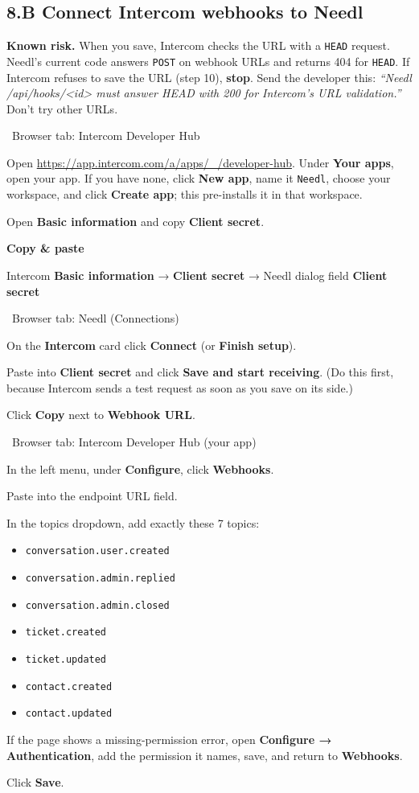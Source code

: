 \documentclass[11pt,a4paper]{article}
\newcommand{\ui}[1]{\textbf{#1}}
\newcommand{\where}[1]{\par\smallskip\noindent\colorbox{winbg}{\color{winfg}\bfseries\strut\ #1\ }\par\nopagebreak[4]}
\newcommand{\lit}[1]{\texttt{#1}}
\newenvironment{xfer}{\def\FrameCommand{\fboxsep=6pt\colorbox{xferbg}}\MakeFramed{\advance\hsize-\width\FrameRestore}\textbf{Copy \& paste}\par}{\endMakeFramed}
\newenvironment{warn}{\def\FrameCommand{\fboxsep=6pt\colorbox{warnbg}}\MakeFramed{\advance\hsize-\width\FrameRestore}}{\endMakeFramed}
\begin{document}
\subsection*{8.B Connect Intercom webhooks to Needl}
\begin{warn}
\textbf{Known risk.} When you save, Intercom checks the URL with a \lit{HEAD} request. Needl's current code answers \lit{POST} on webhook URLs and returns 404 for \lit{HEAD}. If Intercom refuses to save the URL (step 10), \textbf{stop}. Send the developer this: \emph{“Needl /api/hooks/<id> must answer HEAD with 200 for Intercom's URL validation.”} Don't try other URLs.
\end{warn}
\where{Browser tab: Intercom Developer Hub}
\begin{steps}
\item Open \url{https://app.intercom.com/a/apps/_/developer-hub}. Under \ui{Your apps}, open your app. If you have none, click \ui{New app}, name it \lit{Needl}, choose your workspace, and click \ui{Create app}; this pre-installs it in that workspace.
\item Open \ui{Basic information} and copy \ui{Client secret}.
\end{steps}
\begin{xfer}
Intercom \ui{Basic information} → \ui{Client secret} → Needl dialog field \ui{Client secret}
\end{xfer}
\where{Browser tab: Needl (Connections)}
\begin{steps}[resume]
\item On the \ui{Intercom} card click \ui{Connect} (or \ui{Finish setup}).
\item Paste into \ui{Client secret} and click \ui{Save and start receiving}. (Do this first, because Intercom sends a test request as soon as you save on its side.)
\item Click \ui{Copy} next to \ui{Webhook URL}.
\end{steps}
\where{Browser tab: Intercom Developer Hub (your app)}
\begin{steps}[resume]
\item In the left menu, under \ui{Configure}, click \ui{Webhooks}.
\item Paste into the endpoint URL field.
\item In the topics dropdown, add exactly these 7 topics:
\begin{itemize}[itemsep=0pt]
\item \lit{conversation.user.created}
\item \lit{conversation.admin.replied}
\item \lit{conversation.admin.closed}
\item \lit{ticket.created}
\item \lit{ticket.updated}
\item \lit{contact.created}
\item \lit{contact.updated}
\end{itemize}
\item If the page shows a missing-permission error, open \ui{Configure → Authentication}, add the permission it names, save, and return to \ui{Webhooks}.
\item Click \ui{Save}.
\end{steps}
\end{document}
